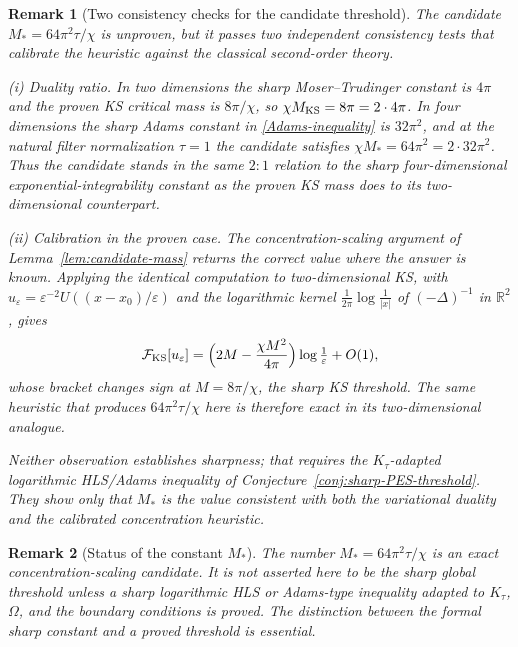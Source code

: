 \documentclass[pdflatex,sn-mathphys-num]{sn-jnl}%
\theoremstyle{thmstyleone}
\theoremstyle{thmstyletwo}
\newtheorem{remark}{Remark}
\theoremstyle{thmstylethree}
\begin{document}
\begin{remark}[Two consistency checks for the candidate threshold]
\label{rem:consistency-checks}
The candidate $M_*=64\pi^2\tau/\chi$ is unproven, but it passes two
independent consistency tests that calibrate the heuristic against the
classical second-order theory.

\emph{(i) Duality ratio.} In two dimensions the sharp Moser--Trudinger
constant is $4\pi$ and the proven KS critical mass is $8\pi/\chi$, so
$\chi M_{\rm KS}=8\pi=2\cdot4\pi$. In four dimensions the sharp Adams
constant in \eqref{Adams-inequality} is $32\pi^2$, and at the natural filter
normalization $\tau=1$ the candidate satisfies $\chi M_*=64\pi^2=2\cdot
32\pi^2$. Thus the candidate stands in the same $2{:}1$ relation to the sharp
four-dimensional exponential-integrability constant as the proven KS mass does
to its two-dimensional counterpart.

\emph{(ii) Calibration in the proven case.} The concentration-scaling argument
of Lemma~\ref{lem:candidate-mass} returns the correct value where the answer
is known. Applying the identical computation to two-dimensional KS, with
$u_\varepsilon=\varepsilon^{-2}U((x-x_0)/\varepsilon)$ and the logarithmic
kernel $\tfrac{1}{2\pi}\log\frac1{|x|}$ of $(-\Delta)^{-1}$ in $\mathbb R^2$,
gives
\[
   \mathcal F_{\mathrm{KS}}[u_\varepsilon]
   =\Bigl(2M-\frac{\chi M^2}{4\pi}\Bigr)\log\tfrac1\varepsilon+O(1),
\]
whose bracket changes sign at $M=8\pi/\chi$, the sharp KS threshold. The same
heuristic that produces $64\pi^2\tau/\chi$ here is therefore exact in its
two-dimensional analogue.

Neither observation establishes sharpness; that requires the
$K_\tau$-adapted logarithmic HLS/Adams inequality of
Conjecture~\ref{conj:sharp-PES-threshold}. They show only that $M_*$ is the
value consistent with both the variational duality and the calibrated
concentration heuristic.
\end{remark}

\begin{remark}[Status of the constant \(M_*\)]
\label{rem:status-Mstar}
The number \(M_*=64\pi^2\tau/\chi\) is an exact concentration-scaling
candidate.  It is not asserted here to be the sharp global threshold unless a
sharp logarithmic HLS or Adams-type inequality adapted
to \(K_\tau\), \(\Omega\), and the boundary conditions is proved.  The
distinction between the formal sharp constant and a proved threshold is
essential.
\end{remark}
\end{document}
